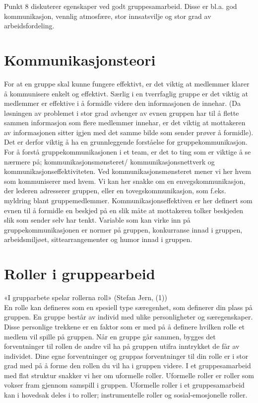 Punkt 8 diskuterer egenskaper ved godt gruppesamarbeid. Disse er bl.a. god kommunikasjon, vennlig atmosfære, stor innsatsvilje og stor grad av arbeidsfordeling.\\

\section{Kommunikasjonsteori}
\label{sec:kommunikasjonsteori}

%

For at en gruppe skal kunne fungere effektivt, er det viktig at medlemmer klarer å kommunisere enkelt og effektivt. Særlig i en tverrfaglig gruppe er det viktig at medlemmer er effektive i å formidle videre den informasjonen de innehar. (Da løsningen av problemet i stor grad avhenger av evnen gruppen har til å flette sammen informasjon som flere medlemmer innehar, er det viktig at mottakeren av informasjonen sitter igjen med det samme bilde som sender prøver å formidle). Det er derfor viktig å ha en grunnleggende forståelse for gruppekommunikasjon.\\

For å forstå gruppekommunikasjonen i et team, er det to ting som er viktige å se nærmere på; kommunikasjonsmønsteret/ kommunikasjonsnettverk og kommunikasjonseffektiviteten. Ved kommunikasjonsmønsteret mener vi her hvem som kommuniserer med hvem. Vi kan her snakke om en envegskommunikasjon, der lederen adresserer gruppen, eller en tovegskommunikasjon, som f.eks. myldring blant gruppemedlemmer. Kommunikasjonseffektiven er her definert som evnen til å formidle en beskjed på en slik måte at mottakeren tolker beskjeden slik som sender selv har tenkt.
Variable som kan virke inn på gruppekommunikasjonen er normer på gruppen, konkurranse innad i gruppen, arbeidsmiljøet, sittearrangementer og humor innad i gruppen.\\


\section{Roller i gruppearbeid}\label{avs:roller}
«I grupparbete spelar rollerna roll» (Stefan Jern, (1))\\

En rolle kan defineres som en spesiell type særegenhet, som definerer din plass på gruppen. En gruppe består av individ med ulike personligheter og særegenskaper.  Disse personlige trekkene er en faktor som er med på å definere hvilken rolle et medlem vil spille på gruppen. Når en gruppe går sammen, bygges det forventninger til rollen de andre vil ha på gruppen utifra inntrykket de får av individet. Dine egne forventninger og gruppas forventninger til din rolle er i stor grad med på å forme den rollen du vil ha i gruppen videre. I et gruppesamarbeid med flat struktur snakker vi her om uformelle roller. Uformelle roller er roller som vokser fram gjennom samspill i gruppen. Uformelle roller i et gruppesamarbeid kan i hovedsak deles i to roller; instrumentelle roller og sosial-emosjonelle roller. \\

